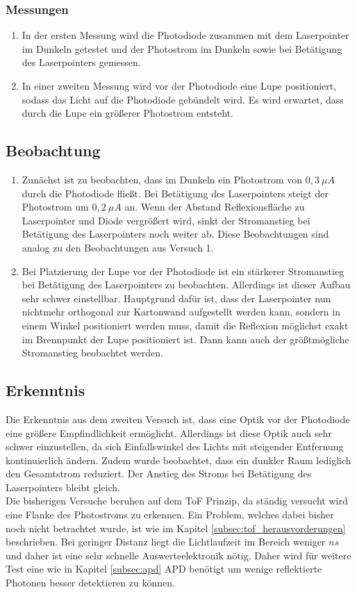 \subsubsection{Messungen}
\begin{enumerate}
	\item In der ersten Messung wird die Photodiode zusammen mit dem Laserpointer im Dunkeln getestet und der Photostrom im Dunkeln sowie bei Betätigung des Laserpointers gemessen.
	\item In einer zweiten Messung wird vor der Photodiode eine Lupe positioniert, sodass das Licht auf die Photodiode gebündelt wird. Es wird erwartet, dass durch die Lupe ein größerer Photostrom entsteht.
\end{enumerate}
\newpage
\subsection{Beobachtung}
\begin{enumerate}
	\item Zunächst ist zu beobachten, dass im Dunkeln ein Photostrom von $0,3\:\mu A$ durch die Photodiode fließt. Bei Betätigung des Laserpointers steigt der Photostrom um $0,2\:\mu A$ an. Wenn der Abstand Reflexionsfläche zu Laserpointer und Diode vergrößert wird, sinkt der Stromanstieg bei Betätigung des Laserpointers noch weiter ab. Diese Beobachtungen sind analog zu den Beobachtungen aus Versuch 1.
	\item Bei Platzierung der Lupe vor der Photodiode ist ein stärkerer Stromanstieg bei Betätigung des Laserpointers zu beobachten. Allerdings ist dieser Aufbau sehr schwer einstellbar. Hauptgrund dafür ist, dass der Laserpointer nun nichtmehr orthogonal zur Kartonwand aufgestellt werden kann, sondern in einem Winkel positioniert werden muss, damit die Reflexion möglichst exakt im Brennpunkt der Lupe positioniert ist. Dann kann auch der größtmögliche Stromanstieg beobachtet werden. 
\end{enumerate}
\subsection{Erkenntnis}
Die Erkenntnis aus dem zweiten Versuch ist, dass eine Optik vor der Photodiode eine größere Empfindlichkeit ermöglicht. Allerdings ist diese Optik auch sehr schwer einzustellen, da sich Einfallswinkel des Lichts mit steigender Entfernung kontinuierlich ändern. Zudem wurde beobachtet, dass ein dunkler Raum lediglich den Gesamtstrom reduziert. Der Anstieg des Stroms bei Betätigung des Laserpointers bleibt gleich.\\
Die bisherigen Versuche beruhen auf dem \ac{ToF} Prinzip, da ständig versucht wird eine Flanke des Photostroms zu erkennen. Ein Problem, welches dabei bisher noch nicht betrachtet wurde, ist wie im Kapitel \ref{subsec:tof_herausvorderungen} beschrieben. Bei geringer Distanz liegt die Lichtlaufzeit im Bereich weniger $ns$ und daher ist eine sehr schnelle Auswerteelektronik nötig. Daher wird für weitere Test eine wie in Kapitel \ref{subsec:apd} \ac{APD} benötigt um wenige reflektierte Photonen besser detektieren zu können.
\newpage
